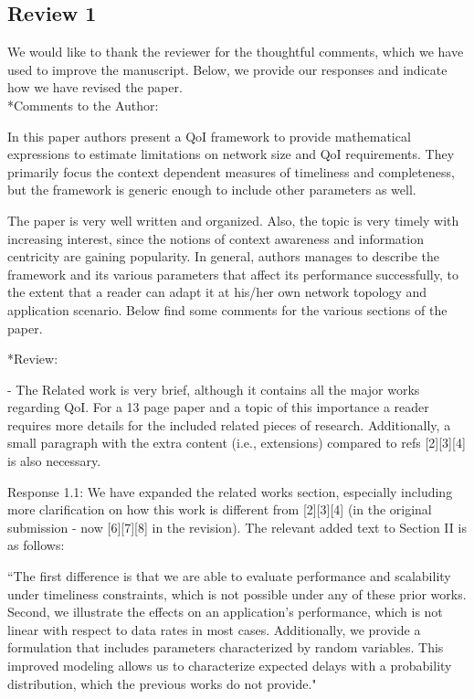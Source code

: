 \documentclass[12pt, letterpaper, onecolumn]{IEEEtran}
\begin{document}
\subsection {Review 1}

{\color {blue}We would like to thank the reviewer for the thoughtful comments, which we have used to improve the manuscript. Below, we provide our responses and indicate how we have revised the paper.}\\

\noindent**Comments to the Author:

In this paper authors present a QoI framework to provide mathematical expressions to estimate limitations on network size and QoI requirements. They primarily focus the context dependent measures of timeliness and completeness, but the framework is generic enough to include other parameters as well.

The paper is very well written and organized. Also, the topic is very timely with increasing interest, since the notions of context awareness and information centricity are gaining popularity. In general, authors manages to describe the framework and its various parameters that affect its performance successfully, to the extent that a reader can adapt it at his/her own network topology and application scenario. Below find some comments for the various sections of the paper.

\noindent**Review: 

- The Related work is very brief, although it contains all the major works regarding QoI. For a 13 page paper and a topic of this importance a reader requires more details for the included related pieces of research. Additionally, a small paragraph with the extra content (i.e., extensions) compared to refs [2][3][4] is also necessary.

{\color {blue}Response 1.1: We have expanded the related works section, especially including more clarification on how this work is different from [2][3][4] (in the original submission - now [6][7][8] in the revision). The relevant added text to Section II is as follows: 

``The first difference is that we are able to evaluate performance and scalability under timeliness constraints, which is not possible under any of these prior works. Second, we illustrate the effects on an application's performance, which is not linear with respect to data rates in most cases. Additionally, we provide a formulation that includes parameters characterized by random variables. This improved modeling allows us to characterize expected delays with a probability distribution, which the previous works do not provide."
}
\end{document}
